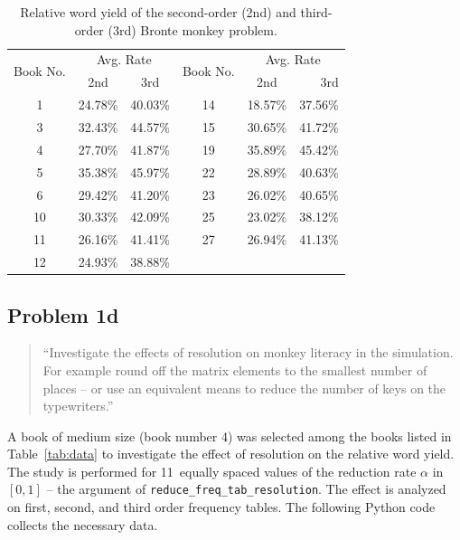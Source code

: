 \documentclass[conference]{IEEEtran}
\newcommand{\codeinline}[1]{{\fontsize{8}{0}\selectfont\texttt{#1}}}
\begin{document}
\begin{table}[htb]
\caption{Relative word yield of the second-order (2nd) and 
third-order (3rd) Bronte monkey problem.\label{tab:problem1c}}
\vspace{-10pt}
\begin{center}

\begin{tabular}{cccccr}
\hline 
\multirow{2}{*}{Book No.} & \multicolumn{2}{c}{Avg. Rate} & \multirow{2}{*}{Book No.} & \multicolumn{2}{c}{Avg. Rate} \\
\cline{2-3} \cline{5-6} 
 & 2nd & 3rd &  & 2nd & 3rd\hspace{0.75em} \\
\hline
1  & 24.78\% & 40.03\% & 14 & 18.57\% & 37.56\% \\
3  & 32.43\% & 44.57\% & 15 & 30.65\% & 41.72\% \\
4  & 27.70\% & 41.87\% & 19 & 35.89\% & 45.42\% \\
5  & 35.38\% & 45.97\% & 22 & 28.89\% & 40.63\% \\
6  & 29.42\% & 41.20\% & 23 & 26.02\% & 40.65\% \\
10 & 30.33\% & 42.09\% & 25 & 23.02\% & 38.12\% \\
11 & 26.16\% & 41.41\% & 27 & 26.94\% & 41.13\% \\
12 & 24.93\% & 38.88\% &    &    & \\
\hline
\end{tabular}
\end{center}
\end{table}


\subsection{Problem 1d}

\begin{quote}
``Investigate the effects of resolution on monkey literacy in the simulation. 
For example round off the matrix elements to the smallest number of places 
-- or use an equivalent means to reduce the number of keys on the typewriters.''
\end{quote}
\vspace{0.75em}

A book of medium size (book number 4) was selected among the books listed in Table~\ref{tab:data} to investigate the effect of resolution on the relative word yield.
The study is performed for 11~equally spaced values of the reduction rate $\alpha$ in $[0,1]$ -- the argument of \codeinline{reduce\_freq\_tab\_resolution}.
The effect is analyzed on first, second, and third order frequency tables.
The following Python code collects the necessary data.
\end{document}
